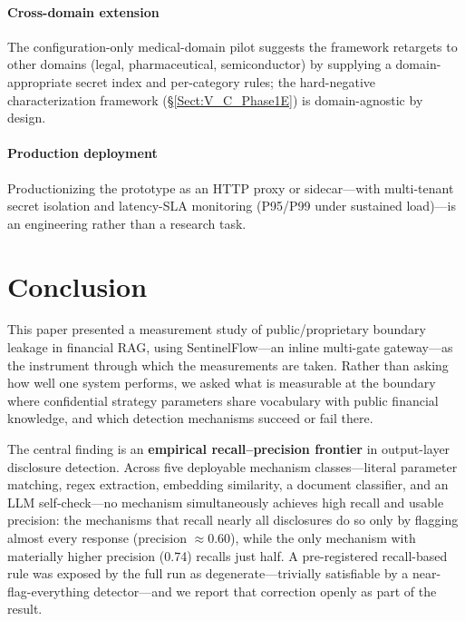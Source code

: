 \documentclass[journal]{IEEEtran}
\begin{document}
\paragraph{Cross-domain extension}
The configuration-only medical-domain pilot suggests the framework retargets to other domains (legal, pharmaceutical, semiconductor) by supplying a domain-appropriate secret index and per-category rules; the hard-negative characterization framework (\S\ref{Sect:V_C_Phase1E}) is domain-agnostic by design.

\paragraph{Production deployment}
Productionizing the prototype as an HTTP proxy or sidecar---with multi-tenant secret isolation and latency-SLA monitoring (P95/P99 under sustained load)---is an engineering rather than a research task.

\section{Conclusion}
\label{Sect:Conclusion}



This paper presented a measurement study of public/proprietary boundary leakage
in financial RAG, using SentinelFlow---an inline multi-gate gateway---as the
instrument through which the measurements are taken. Rather than asking how well
one system performs, we asked what is measurable at the boundary where
confidential strategy parameters share vocabulary with public financial
knowledge, and which detection mechanisms succeed or fail there.

The central finding is an \textbf{empirical recall--precision frontier} in
output-layer disclosure detection. Across five deployable mechanism
classes---literal parameter matching, regex extraction, embedding similarity, a
document classifier, and an LLM self-check---no mechanism simultaneously achieves
high recall and usable precision: the mechanisms that recall nearly all
disclosures do so only by flagging almost every response (precision $\approx
0.60$), while the only mechanism with materially higher precision (0.74) recalls
just half. A pre-registered recall-based rule was exposed by the full run as
degenerate---trivially satisfiable by a near-flag-everything detector---and we
report that correction openly as part of the result.
\end{document}
